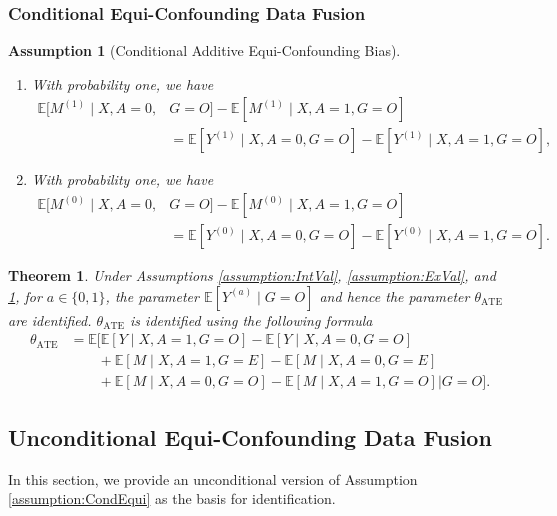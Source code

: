 \documentclass[10pt]{article}
\newtheorem{theorem}{Theorem}
\newtheorem{assumption}{Assumption}
\newcommand{\E}{\mathbb{E}}
\begin{document}
\subsubsection{Conditional Equi-Confounding Data Fusion}


\begin{assumption}[Conditional Additive Equi-Confounding Bias]
\label{assumption:CondEqui::supp}
~
\begin{enumerate}[label=(\roman*)]
\item With probability one, we have
\begin{align*}
\E[M^{(1)}\mid  X,A=0,&G=O]-\E[M^{(1)}\mid  X,A=1,G=O]\\
&=\E[Y^{(1)}\mid  X,A=0,G=O]-\E[Y^{(1)}\mid  X,A=1,G=O],
\end{align*}
\item With probability one, we have
\begin{align*}
\E[M^{(0)}\mid X,A=0,&G=O]-\E[M^{(0)}\mid  X,A=1,G=O]\\
&=\E[Y^{(0)}\mid  X,A=0,G=O]-\E[Y^{(0)}\mid  X,A=1,G=O].
\end{align*}	
\end{enumerate}
\end{assumption}


\begin{theorem}
\label{thm:equiATECond}
Under Assumptions \ref{assumption:IntVal}, \ref{assumption:ExVal}, and \ref{assumption:CondEqui::supp}, for $a\in\{0,1\}$, the parameter $\E[Y^{(a)}\mid G=O]$  and hence the parameter $\theta_{\text{ATE}}$ are identified. $\theta_{\text{ATE}}$ is identified using the following formula
\begin{align*}
\theta_{\text{ATE}}
&=\E\big[
\E[Y\mid X,A=1,G=O]-\E[Y\mid X,A=0,G=O]\\
&\quad\quad+\E[M\mid X,A=1,G=E]-\E[M\mid X,A=0,G=E]\\
&\quad\quad+\E[M\mid X,A=0,G=O]-\E[M\mid X,A=1,G=O]
\big| G=O\big].
\end{align*}
\end{theorem}




\subsection{Unconditional Equi-Confounding Data Fusion}
\label{sec:UNCondEqui::supp}

In this section, we provide an unconditional version of Assumption \ref{assumption:CondEqui} as the basis for identification.
\end{document}
